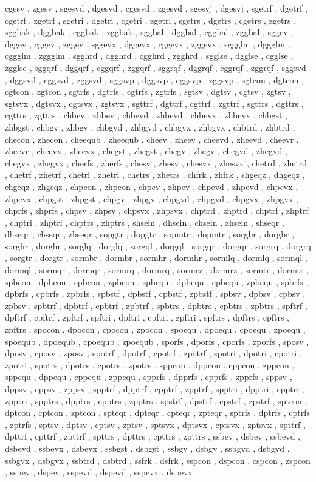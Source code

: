 \documentclass{article}
\begin{document}
cgesv , zgesv , sgesvd , dgesvd , cgesvd , zgesvd , sgesvj , dgesvj , sgetrf , dgetrf , cgetrf , zgetrf , sgetri , dgetri , cgetri , zgetri , sgetrs , dgetrs , cgetrs , zgetrs , sggbak , dggbak , cggbak , zggbak , sggbal , dggbal , cggbal , zggbal , sggev , dggev , cggev , zggev , sggevx , dggevx , cggevx , zggevx , sggglm , dggglm , cggglm , zggglm , sgghrd , dgghrd , cgghrd , zgghrd , sgglse , dgglse , cgglse , zgglse , sggqrf , dggqrf , cggqrf , zggqrf , sggrqf , dggrqf , cggrqf , zggrqf , sggsvd , dggsvd , cggsvd , zggsvd , sggsvp , dggsvp , cggsvp , zggsvp , sgtcon , dgtcon , cgtcon , zgtcon , sgtrfs , dgtrfs , cgtrfs , zgtrfs , sgtsv , dgtsv , cgtsv , zgtsv , sgtsvx , dgtsvx , cgtsvx , zgtsvx , sgttrf , dgttrf , cgttrf , zgttrf , sgttrs , dgttrs , cgttrs , zgttrs , chbev , zhbev , chbevd , zhbevd , chbevx , zhbevx , chbgst , zhbgst , chbgv , zhbgv , chbgvd , zhbgvd , chbgvx , zhbgvx , chbtrd , zhbtrd , checon , zhecon , cheequb , zheequb , cheev , zheev , cheevd , zheevd , cheevr , zheevr , cheevx , zheevx , chegst , zhegst , chegv , zhegv , chegvd , zhegvd , chegvx , zhegvx , cherfs , zherfs , chesv , zhesv , chesvx , zhesvx , chetrd , zhetrd , chetrf , zhetrf , chetri , zhetri , chetrs , zhetrs , chfrk , zhfrk , shgeqz , dhgeqz , chgeqz , zhgeqz , chpcon , zhpcon , chpev , zhpev , chpevd , zhpevd , chpevx , zhpevx , chpgst , zhpgst , chpgv , zhpgv , chpgvd , zhpgvd , chpgvx , zhpgvx , chprfs , zhprfs , chpsv , zhpsv , chpsvx , zhpsvx , chptrd , zhptrd , chptrf , zhptrf , chptri , zhptri , chptrs , zhptrs , shsein , dhsein , chsein , zhsein , shseqr , dhseqr , chseqr , zhseqr , sopgtr , dopgtr , sopmtr , dopmtr , sorgbr , dorgbr , sorghr , dorghr , sorglq , dorglq , sorgql , dorgql , sorgqr , dorgqr , sorgrq , dorgrq , sorgtr , dorgtr , sormbr , dormbr , sormhr , dormhr , sormlq , dormlq , sormql , dormql , sormqr , dormqr , sormrq , dormrq , sormrz , dormrz , sormtr , dormtr , spbcon , dpbcon , cpbcon , zpbcon , spbequ , dpbequ , cpbequ , zpbequ , spbrfs , dpbrfs , cpbrfs , zpbrfs , spbstf , dpbstf , cpbstf , zpbstf , spbsv , dpbsv , cpbsv , zpbsv , spbtrf , dpbtrf , cpbtrf , zpbtrf , spbtrs , dpbtrs , cpbtrs , zpbtrs , spftrf , dpftrf , cpftrf , zpftrf , spftri , dpftri , cpftri , zpftri , spftrs , dpftrs , cpftrs , zpftrs , spocon , dpocon , cpocon , zpocon , spoequ , dpoequ , cpoequ , zpoequ , spoequb , dpoequb , cpoequb , zpoequb , sporfs , dporfs , cporfs , zporfs , sposv , dposv , cposv , zposv , spotrf , dpotrf , cpotrf , zpotrf , spotri , dpotri , cpotri , zpotri , spotrs , dpotrs , cpotrs , zpotrs , sppcon , dppcon , cppcon , zppcon , sppequ , dppequ , cppequ , zppequ , spprfs , dpprfs , cpprfs , zpprfs , sppsv , dppsv , cppsv , zppsv , spptrf , dpptrf , cpptrf , zpptrf , spptri , dpptri , cpptri , zpptri , spptrs , dpptrs , cpptrs , zpptrs , spstrf , dpstrf , cpstrf , zpstrf , sptcon , dptcon , cptcon , zptcon , spteqr , dpteqr , cpteqr , zpteqr , sptrfs , dptrfs , cptrfs , zptrfs , sptsv , dptsv , cptsv , zptsv , sptsvx , dptsvx , cptsvx , zptsvx , spttrf , dpttrf , cpttrf , zpttrf , spttrs , dpttrs , cpttrs , zpttrs , ssbev , dsbev , ssbevd , dsbevd , ssbevx , dsbevx , ssbgst , dsbgst , ssbgv , dsbgv , ssbgvd , dsbgvd , ssbgvx , dsbgvx , ssbtrd , dsbtrd , ssfrk , dsfrk , sspcon , dspcon , cspcon , zspcon , sspev , dspev , sspevd , dspevd , sspevx , dspevx 
\end{document}
